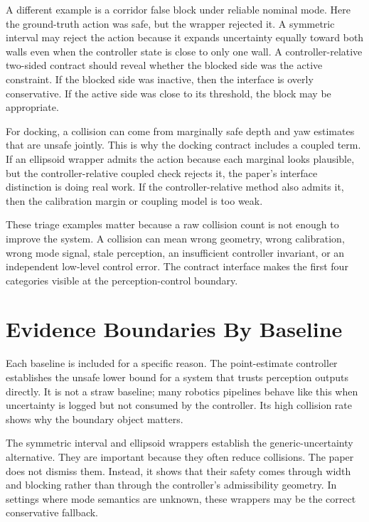 \documentclass{article}
\begin{document}
A different example is a corridor false block under reliable nominal mode. Here the ground-truth action was safe, but the wrapper rejected it. A symmetric interval may reject the action because it expands uncertainty equally toward both walls even when the controller state is close to only one wall. A controller-relative two-sided contract should reveal whether the blocked side was the active constraint. If the blocked side was inactive, then the interface is overly conservative. If the active side was close to its threshold, the block may be appropriate.

For docking, a collision can come from marginally safe depth and yaw estimates that are unsafe jointly. This is why the docking contract includes a coupled term. If an ellipsoid wrapper admits the action because each marginal looks plausible, but the controller-relative coupled check rejects it, the paper's interface distinction is doing real work. If the controller-relative method also admits it, then the calibration margin or coupling model is too weak.

These triage examples matter because a raw collision count is not enough to improve the system. A collision can mean wrong geometry, wrong calibration, wrong mode signal, stale perception, an insufficient controller invariant, or an independent low-level control error. The contract interface makes the first four categories visible at the perception-control boundary.

\section{Evidence Boundaries By Baseline}

Each baseline is included for a specific reason. The point-estimate controller establishes the unsafe lower bound for a system that trusts perception outputs directly. It is not a straw baseline; many robotics pipelines behave like this when uncertainty is logged but not consumed by the controller. Its high collision rate shows why the boundary object matters.

The symmetric interval and ellipsoid wrappers establish the generic-uncertainty alternative. They are important because they often reduce collisions. The paper does not dismiss them. Instead, it shows that their safety comes through width and blocking rather than through the controller's admissibility geometry. In settings where mode semantics are unknown, these wrappers may be the correct conservative fallback.
\end{document}
